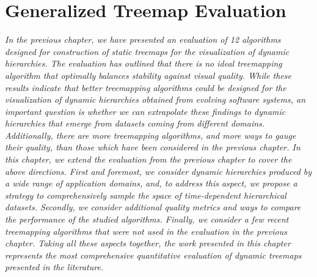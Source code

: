 \chapter{Generalized Treemap Evaluation}
\label{ch:tree-eval}

\newcommand{\mypar}[1]{\smallskip\noindent{\bfseries #1.}}




\textit{
In the previous chapter, we have presented an evaluation of 12 algorithms designed for construction of static treemaps for the visualization of dynamic hierarchies. 
The evaluation has outlined that there is no ideal treemapping algorithm that optimally balances stability against visual quality. While these results 
indicate that better treemapping algorithms could be designed for the visualization of dynamic hierarchies obtained from evolving software systems, an important question is whether we can extrapolate
these findings to dynamic hierarchies that emerge from datasets coming from different domains. Additionally, there are more treemapping algorithms, and more ways to gauge their quality, than those 
which have been considered in the previous chapter. In this chapter, we extend the evaluation from the previous chapter to cover the above directions. First and foremost, we consider dynamic hierarchies produced by a wide range of application domains, and, to
address this aspect, we propose a strategy to comprehensively sample the space of time-dependent hierarchical datasets. Secondly, we consider additional quality metrics and ways to compare the performance of the studied algorithms. Finally, we consider a few recent treemapping algorithms that were not used in the evaluation in the previous chapter. Taking all these aspects together, the work presented in this chapter represents the most comprehensive quantitative evaluation of dynamic treemaps presented in the literature.
}

